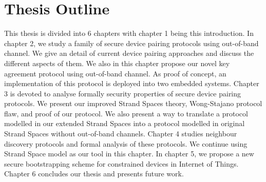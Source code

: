 \section{Thesis Outline}
This thesis is divided into 6 chapters with chapter 1 being this introduction. In chapter 2, we study a family of secure device pairing protocols using out-of-band channel. We give an detail of current device pairing approaches and discuss the different aspects of them. We also in this chapter propose our novel key agreement protocol using out-of-band channel. As proof of concept, an implementation of this protocol is deployed into two embedded systems. Chapter 3 is devoted to analyse formally security properties of secure device pairing protocols. We present our improved Strand Spaces theory, Wong-Stajano protocol flaw, and proof of our protocol. We also present a way to translate a protocol modelled in our extended Strand Spaces into a protocol modelled in original Strand Spaces without out-of-band channels. Chapter 4 studies neighbour discovery protocols and formal analysis of these protocols. We continue using Strand Space model as our tool in this chapter. In chapter 5, we propose a new secure bootstrapping scheme for constrained devices in Internet of Things. Chapter 6 concludes our thesis and presents future work. 


